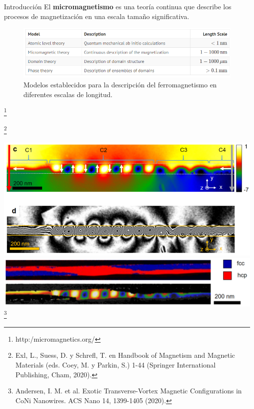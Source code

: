 \documentclass{beamer}
\newcommand\blfootnote[1]{%
  \begingroup
  \renewcommand\thefootnote{}\footnote{#1}%
  \addtocounter{footnote}{-1}%
  \endgroup
}
\begin{document}
\begin{frame}{Introducción}
    El \textbf{micromagnetismo} es una teoría continua que describe los procesos de magnetización en una escala tamaño significativa.
    
    \medskip
    
    \begin{figure}
        \centering
        \includegraphics[scale=0.45]{pic/micromagnetism.png}
        \caption{Modelos establecidos para la descripción del ferromagnetismo en diferentes escalas de longitud.}
    \end{figure}
    
    \blfootnote{ {\tiny http:/micromagnetics.org/}}
    \blfootnote{ {\tiny Exl, L., Suess, D. y Schrefl, T. en Handbook of Magnetism and Magnetic Materials (eds. Coey, M. y Parkin, S.) 1-44 (Springer International Publishing, Cham, 2020).}}
\end{frame}

\begin{frame}
    \centering
    \includegraphics[scale=0.4]{pic/Vortex.png}
    \includegraphics[scale=0.34]{pic/EstructuraCristalina.png}   
    \blfootnote{ {\tiny Andersen, I. M. et al. Exotic Transverse-Vortex Magnetic Configurations in CoNi Nanowires. ACS Nano 14, 1399-1405 (2020).}}
\end{frame}
\end{document}
